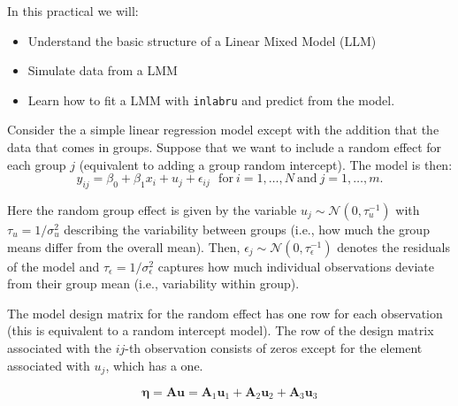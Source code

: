 \documentclass[
  letterpaper,
  DIV=11,
  numbers=noendperiod]{scrartcl}
\providecommand{\tightlist}{%
  \setlength{\itemsep}{0pt}\setlength{\parskip}{0pt}}\usepackage{longtable,booktabs,array}
\begin{document}
In this practical we will:

\begin{itemize}
\tightlist
\item
  Understand the basic structure of a Linear Mixed Model (LLM)
\item
  Simulate data from a LMM
\item
  Learn how to fit a LMM with \texttt{inlabru} and predict from the
  model.
\end{itemize}

Consider the a simple linear regression model except with the addition
that the data that comes in groups. Suppose that we want to include a
random effect for each group \(j\) (equivalent to adding a group random
intercept). The model is then: \[
 y_{ij}  = \beta_0 + \beta_1 x_i + u_j + \epsilon_{ij} ~~~  \text{for}~i = 1,\ldots,N~ \text{and}~ j = 1,\ldots,m.
\]

Here the random group effect is given by the variable
\(u_j \sim \mathcal{N}(0, \tau^{-1}_u)\) with \(\tau_u = 1/\sigma^2_u\)
describing the variability between groups (i.e., how much the group
means differ from the overall mean). Then,
\(\epsilon_j \sim \mathcal{N}(0, \tau^{-1}_\epsilon)\) denotes the
residuals of the model and \(\tau_\epsilon = 1/\sigma^2_\epsilon\)
captures how much individual observations deviate from their group mean
(i.e., variability within group).

The model design matrix for the random effect has one row for each
observation (this is equivalent to a random intercept model). The row of
the design matrix associated with the \(ij\)-th observation consists of
zeros except for the element associated with \(u_j\), which has a one.

\[
\pmb{\eta} = \pmb{A}\pmb{u} = \pmb{A}_1\pmb{u}_1 + \pmb{A}_2\pmb{u}_2 + \pmb{A}_3\pmb{u}_3
\]
\end{document}
